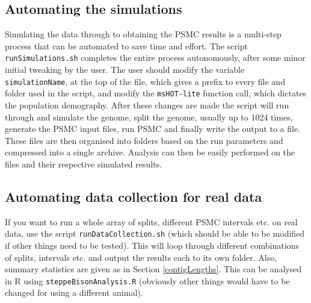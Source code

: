 \documentclass[11pt,a4paper]{article}
\begin{document}
\subsection{Automating the simulations}

Simulating the data through to obtaining the PSMC results is a multi-step process that can be automated to save time and effort. The script \verb|runSimulations.sh| completes the entire process autonomously, after some minor initial tweaking by the user. The user should modify the variable \verb|simulationName|, at the top of the file, which gives a prefix to every file and folder used in the script, and modify the \verb|msHOT-lite| function call, which dictates the population demography. After these changes are made the script will run through and simulate the genome, split the genome, usually up to 1024 times, generate the PSMC input files, run PSMC and finally write the output to a file. These files are then organised into folders based on the run parameters and compressed into a single archive. Analysis can then be easily performed on the files and their respective simulated results.

\subsection{Automating data collection for real data}
If you want to run a whole array of splits, different PSMC intervals etc. on real data, use the script \verb|runDataCollection.sh| (which should be able to be modified if other things need to be tested). This will loop through different combinations of splits, intervals etc. and output the results each to its own folder. Also, summary statistics are given as in Section \ref{contigLengths}. This can be analysed in R using \verb|steppeBisonAnalysis.R| (obviously other things would have to be changed for using a different animal).
\end{document}
